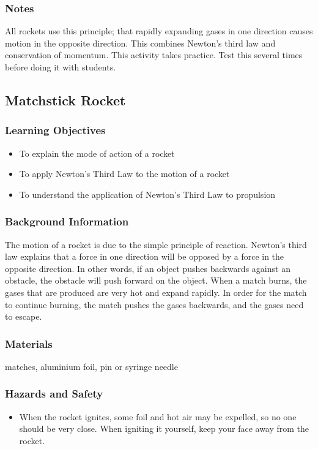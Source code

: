 \subsubsection*{Notes}
All rockets use this principle; that rapidly expanding gases in one direction causes motion in the opposite direction.  This combines Newton's third law and conservation of momentum.
This activity takes practice. Test this several times before doing it with students.  

\subsection{Matchstick Rocket}

\subsubsection*{Learning Objectives}
\begin{itemize}
\item{To explain the mode of action of a rocket} 
\item{To apply Newton's Third Law to the motion of a rocket} 
\item{To understand the application of Newton's Third Law to propulsion} 
\end{itemize}

\subsubsection*{Background Information}
The motion of a rocket is due to the simple principle of reaction.  Newton's third law explains that a force in one direction will be opposed by a force in the opposite direction.  In other words, if an object pushes backwards against an obstacle, the obstacle will push forward on the object.  When a match burns, the gases that are produced are very hot and expand rapidly. In order for the match to continue burning, the match pushes the gases backwards, and the gases need to escape.

\subsubsection*{Materials}
matches, aluminium foil, pin or syringe needle

\subsubsection*{Hazards and Safety}
\begin{itemize}
\item{When the rocket ignites, some foil and hot air may be expelled, so no one should be very close. When igniting it yourself, keep your face away from the rocket.} 
\end{itemize}

